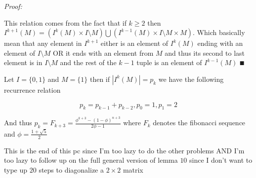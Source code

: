 \documentclass[paper=a4,fontsize=paper,12.5pt]{book}
\newcommand{\3}{\vspace*{3mm}}
\newcommand{\Proof}{\textit{Proof:}}
\begin{document}
\Proof

This relation comes from the fact that if $k \geq 2$ then ${I}^{k+1}(M) = ({I}^{k}(M) \times I \setminus M) \bigcup ({I}^{k-1}(M) \times I \setminus M \times M)$. Which basically mean that any element in ${I}^{k+1}$ either is an element of ${I}^{k}(M)$ ending with an element of ${I \setminus M}$ OR it ends with an element from $M$ and thus its second to last element is in $I \setminus M$ and the rest of the $k-1$ tuple is an element of ${I}^{k-1}(M)$ $\QED$


\3

\begin{corollary}

Let $I = \{0,1\}$ and $M = \{1\}$ then if $|{I}^{k}(M)| = {p}_{k}$ we have the following recurrence relation 

\[{p}_{k} = {p}_{k-1}+{p}_{k-2}, {p}_{0} = 1, {p}_{1} = 2 \]

\3

And thus ${p}_{k} = {F}_{k+3} = \frac{{\phi}^{k+3} - {(1-\phi)}^{n+3}}{2\phi -1}$ where ${F}_{k}$ denotes the fibonacci sequence and $\phi = \frac{1+\sqrt{5}}{2}$
\end{corollary}

\3

This is the end of this pc since I'm too lazy to do the other problems AND I'm too lazy to follow up on the full general version of lemma $10$ since I don't want to type up $20$ steps to diagonalize a $2 \times 2$ matrix 


\3
\end{document}
